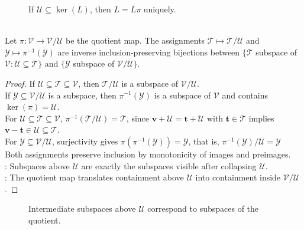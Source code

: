 \begin{figure}[H]
  \centering
  
  \caption{If $\mathcal{U}\subseteq\ker(L)$, then $L=\overline{L}\pi$ uniquely.}
  \label{fig:quotient-universal-property}
\end{figure}

\begin{theorem} \label{thm:subspace-correspondence-quotient} \\
Let $\pi:\mathcal{V}\to\mathcal{V}/\mathcal{U}$ be the quotient map. The assignments $\mathcal{T}\longmapsto \mathcal{T}/\mathcal{U}$ and $\mathcal{Y}\longmapsto \pi^{-1}(\mathcal{Y})$ are inverse inclusion-preserving bijections between $\{\mathcal{T}$ subspace of $\mathcal{V}:\mathcal{U}\subseteq\mathcal{T}\}$ and $\{\mathcal{Y}$ subspace of $\mathcal{V}/\mathcal{U}\}$.
\begin{proof}
If $\mathcal{U}\subseteq\mathcal{T}\subseteq\mathcal{V}$, then $\mathcal{T}/\mathcal{U}$ is a subspace of $\mathcal{V}/\mathcal{U}$.\\
If $\mathcal{Y}\subseteq\mathcal{V}/\mathcal{U}$ is a subspace, then $\pi^{-1}(\mathcal{Y})$ is a subspace of $\mathcal{V}$ and contains $\ker(\pi)=\mathcal{U}$.\\
For $\mathcal{U}\subseteq\mathcal{T}\subseteq\mathcal{V}$, $\pi^{-1}(\mathcal{T}/\mathcal{U})=\mathcal{T}$, since $\mathbf{v}+\mathcal{U}=\mathbf{t}+\mathcal{U}$ with $\mathbf{t}\in\mathcal{T}$ implies $\mathbf{v}-\mathbf{t}\in\mathcal{U}\subseteq\mathcal{T}$.\\
For $\mathcal{Y}\subseteq\mathcal{V}/\mathcal{U}$, surjectivity gives $\pi\left(\pi^{-1}(\mathcal{Y})\right)=\mathcal{Y}$, that is, $\pi^{-1}(\mathcal{Y})/\mathcal{U}=\mathcal{Y}$\\
Both assignments preserve inclusion by monotonicity of images and preimages.\\
: Subspaces above $\mathcal{U}$ are exactly the subspaces visible after collapsing $\mathcal{U}$.\\
: The quotient map translates containment above $\mathcal{U}$ into containment inside $\mathcal{V}/\mathcal{U}$.
\end{proof}
\end{theorem}

\begin{figure}[H]
  \centering
  
  \caption{Intermediate subspaces above $\mathcal{U}$ correspond to subspaces of the quotient.}
  \label{fig:quotient-correspondence-subspaces}
\end{figure}

